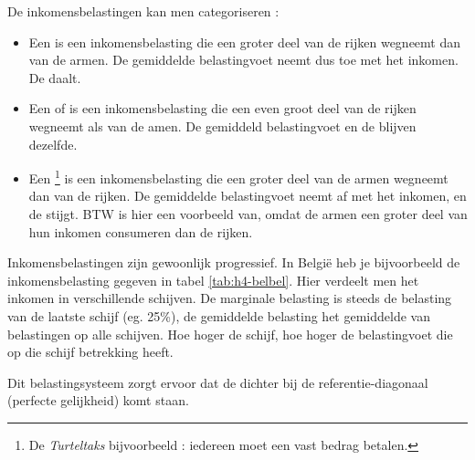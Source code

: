 \par De inkomensbelastingen kan men categoriseren :
\begin{itemize}
\item Een  is een inkomensbelasting die een groter deel van de rijken wegneemt dan van de armen. De gemiddelde belastingvoet neemt dus toe met het inkomen. De  daalt.
\item Een  of  is een inkomensbelasting die een even groot deel van de rijken wegneemt als van de amen. De gemiddeld belastingvoet en de  blijven dezelfde.
\item Een \footnote{De \textit{Turteltaks} bijvoorbeeld : iedereen moet een vast bedrag betalen.} is een inkomensbelasting die een groter deel van de armen wegneemt dan van de rijken. De gemiddelde belastingvoet neemt af met het inkomen, en de  stijgt. BTW is hier een voorbeeld van, omdat de armen een groter deel van hun inkomen consumeren dan de rijken.
\end{itemize}

Inkomensbelastingen zijn gewoonlijk progressief. In Belgi\"e heb je bijvoorbeeld de inkomensbelasting gegeven in tabel \ref{tab:h4-belbel}. Hier verdeelt men het inkomen in verschillende schijven. De marginale belasting is steeds de belasting van de laatste schijf (eg. 25\%), de gemiddelde belasting het gemiddelde van belastingen op alle schijven. Hoe hoger de schijf, hoe hoger de belastingvoet die op die schijf betrekking heeft.
\par Dit belastingsysteem zorgt ervoor dat de  dichter bij de referentie-diagonaal (perfecte gelijkheid) komt staan.

